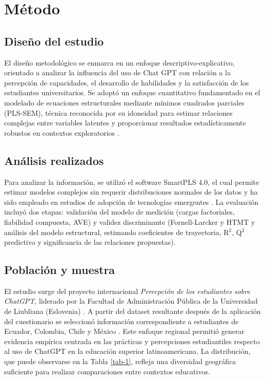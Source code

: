 \documentclass[spanish]{textolivre}
\begin{document}
\section{Método}
\subsection{Diseño del estudio}
El diseño metodológico se enmarca en un enfoque descriptivo-explicativo, orientado a analizar la influencia del uso de Chat GPT con relación a la percepción de capacidades, el desarrollo de habilidades y la satisfacción de los estudiantes universitarios. Se adoptó un enfoque cuantitativo fundamentado en el modelado de ecuaciones estructurales mediante mínimos cuadrados parciales (PLS-SEM), técnica reconocida por su idoneidad para estimar relaciones complejas entre variables latentes y proporcionar resultados estadísticamente robustos en contextos exploratorios \cite{hair2019}. 

\subsection{Análisis realizados}
Para analizar la información, se utilizó el software SmartPLS 4.0, el cual permite estimar modelos complejos sin requerir distribuciones normales de los datos y ha sido empleado en estudios de adopción de tecnologías emergentes \cite{hair2022}. La evaluación incluyó dos etapas: validación del modelo de medición (cargas factoriales, fiabilidad compuesta, AVE) y validez discriminante (Fornell-Larcker y HTMT y análisis del modelo estructural, estimando coeficientes de trayectoria, R$^2$, Q$^2$ predictivo y significancia de las relaciones propuestas).

\subsection{Población y muestra}
El estudio surge del proyecto internacional \textit{Percepción de los estudiantes sobre ChatGPT}, liderado por la Facultad de Administración Pública de la Universidad de Liubliana (Eslovenia) \cite{ravselj2025}. A partir del dataset resultante después de la aplicación del cuestionario se seleccionó información correspondiente a estudiantes de Ecuador, Colombia, Chile y México \cite{ravselj2024}. Este enfoque regional permitió generar evidencia empírica centrada en las prácticas y percepciones estudiantiles respecto al uso de ChatGPT en la educación superior latinoamericana. La distribución, que puede observarse en la Tabla \ref{tab-1}, refleja una diversidad geográfica suficiente para realizar comparaciones entre contextos educativos.
\end{document}
